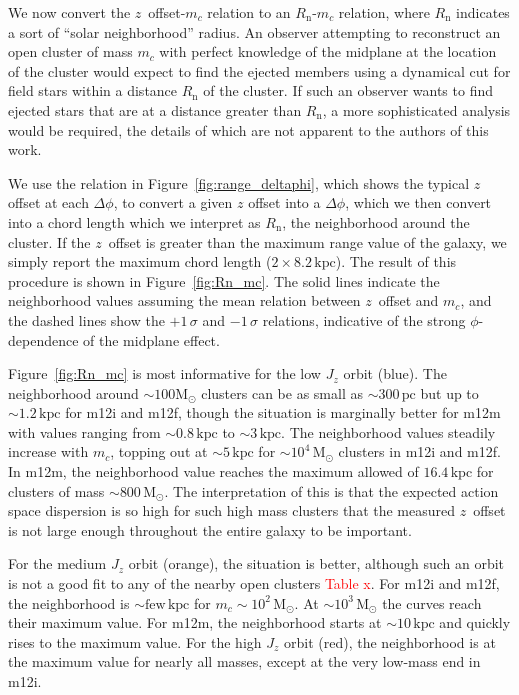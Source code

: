 \documentclass[twocolumn]{aastex62}
\newcommand{\Gus}[1]{\textcolor{red}{#1}}
\newcommand{\Msun}{\text{M}_\odot}
\newcommand{\pc}{\text{pc}}
\newcommand{\kpc}{\text{kpc}}
\newcommand{\n}{\text{n}}
\begin{document}
We now convert the $z$~offset-$m_c$ relation to an $R_{\n}$-$m_c$ relation,
where $R_{\n}$ indicates a sort of ``solar neighborhood'' radius. An observer
attempting to reconstruct an open cluster of mass $m_c$ with perfect knowledge
of the midplane at the location of the cluster would expect to find the
ejected members using a dynamical cut for field stars within a distance
$R_{\n}$ of the cluster. If such an observer wants to find ejected stars that
are at a distance greater than $R_{\n}$, a more sophisticated analysis would
be required, the details of which are not apparent to the authors of this
work.

We use the relation in Figure~\ref{fig:range_deltaphi}, which shows the
typical $z$ offset at each $\Delta \phi$, to convert a given $z$ offset into a
$\Delta\phi$, which we then convert into a chord length which we interpret as
$R_{\n}$, the neighborhood around the cluster. If the $z$~offset is greater
than the maximum range value of the galaxy, we simply report the maximum chord
length ($2\times8.2\,\kpc$). The result of this procedure is shown in
Figure~\ref{fig:Rn_mc}. The solid lines indicate the neighborhood values
assuming the mean relation between $z$~offset and $m_c$, and the dashed lines
show the $+1\,\sigma$ and $-1\,\sigma$ relations, indicative of the strong
$\phi$-dependence of the midplane effect.

Figure~\ref{fig:Rn_mc} is most informative for the low $J_z$ orbit (blue). The
neighborhood around $\sim100\Msun$ clusters can be as small as $\sim300\,\pc$
but up to $\sim1.2\,\kpc$ for m12i and m12f, though the situation is
marginally better for m12m with values ranging from $\sim0.8\,\kpc$ to
$\sim3\,\kpc$. The neighborhood values steadily increase with $m_c$, topping
out at $\sim5\,\kpc$ for $\sim10^4\,\Msun$ clusters in m12i and m12f. In m12m,
the neighborhood value reaches the maximum allowed of $16.4\,\kpc$ for
clusters of mass $\sim800\,\Msun$. The interpretation of this is that the
expected action space dispersion is so high for such high mass clusters that
the measured $z$~offset is not large enough throughout the entire galaxy to be
important.

For the medium $J_z$ orbit (orange), the situation is better, although such an
orbit is not a good fit to any of the nearby open clusters \Gus{Table x}. For
m12i and m12f, the neighborhood is $\sim \text{few}\,\kpc$ for
$m_c\sim10^2\,\Msun$. At $\sim10^3\,\Msun$ the curves reach their maximum
value. For m12m, the neighborhood starts at $\sim10\,\kpc$ and quickly rises
to the maximum value. For the high $J_z$ orbit (red), the neighborhood is at
the maximum value for nearly all masses, except at the very low-mass end in
m12i.
\end{document}

